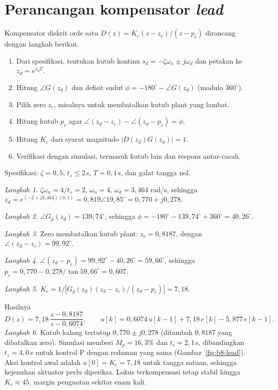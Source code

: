 \section{Perancangan kompensator \textit{lead}}
Kompensator diskrit orde satu $D(z) = K_c(z - z_c)/(z - p_c)$ dirancang dengan langkah berikut.
\begin{enumerate}
	\item Dari spesifikasi, tentukan kutub kontinu $s_d = -\zeta\omega_n \pm j\omega_d$ dan petakan ke $z_d = e^{s_dT}$.
	\item Hitung $\angle G(z_d)$ dan defisit sudut $\phi = -180^\circ - \angle G(z_d)$ (modulo $360^\circ$).
	\item Pilih zero $z_c$, misalnya untuk membatalkan kutub plant yang lambat.
	\item Hitung kutub $p_c$ agar $\angle(z_d - z_c) - \angle(z_d - p_c) = \phi$.
	\item Hitung $K_c$ dari syarat magnitudo $|D(z_d)G(z_d)| = 1$.
	\item Verifikasi dengan simulasi, termasuk kutub lain dan respons antar-cacah.
\end{enumerate}

\begin{contoh}
	Spesifikasi: $\zeta = 0{,}5$, $t_s \le 2$\,s, $T = 0{,}1$\,s, dan galat tangga nol.

	\textit{Langkah 1.} $\zeta\omega_n = 4/t_s = 2$, $\omega_n = 4$, $\omega_d = 3{,}464$ rad/s, sehingga $z_d = e^{(-2+j3{,}464)(0{,}1)} = 0{,}819\angle19{,}85^\circ = 0{,}770 + j0{,}278$.

	\textit{Langkah 2.} $\angle G_p(z_d) = 139{,}74^\circ$, sehingga $\phi = -180^\circ - 139{,}74^\circ + 360^\circ = 40{,}26^\circ$.

	\textit{Langkah 3.} Zero membatalkan kutub plant: $z_c = 0{,}8187$, dengan $\angle(z_d - z_c) = 99{,}92^\circ$.

	\textit{Langkah 4.} $\angle(z_d - p_c) = 99{,}92^\circ - 40{,}26^\circ = 59{,}66^\circ$, sehingga $p_c = 0{,}770 - 0{,}278/\tan59{,}66^\circ = 0{,}607$.

	\textit{Langkah 5.} $K_c = 1/|G_p(z_d)(z_d - z_c)/(z_d - p_c)| = 7{,}18$.

	Hasilnya
	\[
		D(z) = 7{,}18\,\frac{z - 0{,}8187}{z - 0{,}6074},\qquad u[k] = 0{,}6074\,u[k-1] + 7{,}18\,e[k] - 5{,}877\,e[k-1].
	\]
	\textit{Langkah 6.} Kutub kalang tertutup $0{,}770 \pm j0{,}278$ (ditambah $0{,}8187$ yang dibatalkan zero). Simulasi memberi $M_p = 16{,}3\%$ dan $t_s = 2{,}1$\,s, dibandingkan $t_s = 4{,}0$\,s untuk kontrol P dengan redaman yang sama (Gambar~\ref{fig:b8-lead}). Aksi kontrol awal adalah $u[0] = K_c = 7{,}18$ untuk tangga satuan, sehingga kejenuhan aktuator perlu diperiksa. Lokus terkompensasi tetap stabil hingga $K_c \approx 45$, margin penguatan sekitar enam kali.
\end{contoh}

